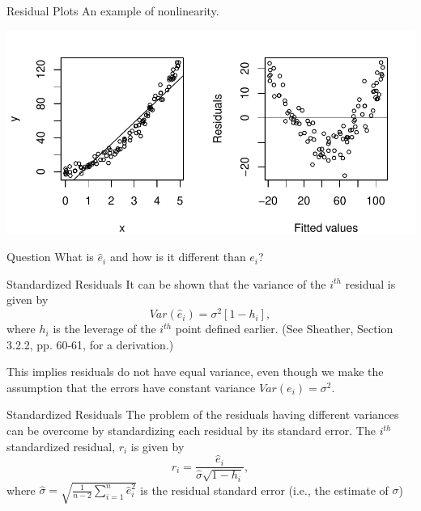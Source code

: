 \documentclass[10pt]{beamer}
\begin{document}
\begin{frame}{Residual Plots}
An example of nonlinearity.

\centering
\includegraphics[scale=0.6]{figure/resid_nonlin.pdf}
\end{frame}

\begin{frame}{Question}
\vspace{-4cm}
\large
What is $\hat{e}_i$ and how is it different than $e_i$?
\end{frame}

\begin{frame}{Standardized Residuals}
It can be shown that the variance of the $i^{th}$ residual is given by
$$Var(\hat{e}_i) = \sigma^2 [1 - h_i],$$
where $h_i$ is the leverage of the $i^{th}$ point defined earlier. (See Sheather, Section 3.2.2, pp. 60-61, for a derivation.)\\
\vspace{15pt}

This implies residuals do not have equal variance, even though we make the assumption that the errors have constant variance $Var(e_i) = \sigma^2$.
\end{frame}

\begin{frame}{Standardized Residuals}
The problem of the residuals having different variances can be overcome by standardizing each residual by its standard error.  The $i^{th}$ standardized residual, $r_i$ is given by
$$r_i = \frac{\hat{e}_i}{\hat{\sigma} \sqrt{1 - h_{i}}},$$
where $\hat{\sigma} = \sqrt{\frac{1}{n-2} \sum_{i=1}^n \hat{e}_i^2}$ is the residual standard error (i.e., the estimate of $\sigma$)
\end{frame}
\end{document}
